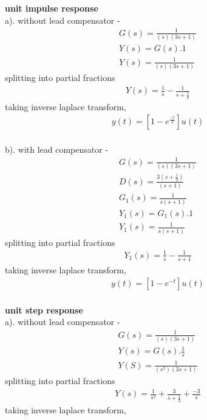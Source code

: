 \begin{enumerate}[label=\thesection.\arabic*.,ref=\thesection.\theenumi]
\textbf{unit impulse response}\\
a). without lead compensator - \\
\begin{align}
G(s) = \frac{1}{(s)(3s+1)}\\
Y(s) = G(s).1\\
Y(s) = \frac{1}{(s)(3s+1)}
\end{align}
splitting into partial fractions\\
\begin{align}
Y(s) = \frac{1}{s} - \frac{1}{s+\frac{1}{3}}
\end{align}
taking inverse laplace transform, \\
\begin{align}
y(t) = [ 1 - e^{\frac{-t}{3}}]u(t)
\end{align}
\\
b). with lead compensator - \\
\begin{align}
G(s) = \frac{1}{(s)(3s+1)}\\
D(s) = \frac{3(s+\frac{1}{3})}{(s+1)} \\
G_{1}(s) = \frac{1}{s(s+1)}\\
Y_{1}(s) = G_{1}(s).1\\
Y_{1}(s) = \frac{1}{s(s+1)}
\end{align}
splitting into partial fractions\\
\begin{align}
Y_{1}(s) = \frac{1}{s} - \frac{1}{s+1}
\end{align}
taking inverse laplace transform, \\
\begin{align}
y(t) = [ 1 - e^{-t}]u(t)
\end{align}
\\
\textbf{unit step response}\\
a). without lead compensator - \\
\begin{align}
G(s) = \frac{1}{(s)(3s+1)}\\
Y(s) = G(s).\frac{1}{s}\\
Y(S) = \frac{1}{(s^2)(3s+1)}
\end{align}
splitting into partial fractions\\
\begin{align}
Y(s) = \frac{1}{s^2} + \frac{3}{s+\frac{1}{3}} + \frac{-3}{s}
\end{align}
taking inverse laplace transform, \\
\begin{align}

\end{align}
\end{enumerate}
